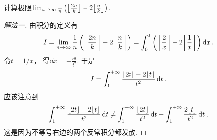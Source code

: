 \begin{example}
计算极限\(\lim_{n\to\infty} \frac1n \left( \floor*{\frac{2n}{k}} - 2 \floor*{\frac{n}{k} \vphantom{\frac{2n}{k}}} \right)\).
\begin{solution}\let\qed\relax
\begin{proof}[解法一]
由积分的定义有\[
	I = \lim_{n\to\infty} \frac1n \left( \floor*{\frac{2n}{k}} - 2 \floor*{\frac{n}{k} \vphantom{\frac{2n}{k}}} \right)
	= \int_0^1 \left( \floor*{\frac2x} - 2 \floor*{\frac1x} \right) \dd{x}.
\]
令\(t = 1/x\)，
得\(\dd{x} = -\frac{\dd{t}}{t^2}\).
于是\[
	I = \int_1^{+\infty} \frac{\lfloor2t\rfloor - 2\lfloor t\rfloor}{t^2} \dd{t}.
\]
应该注意到\[
	\int_1^{+\infty} \frac{\lfloor2t\rfloor - 2\lfloor t\rfloor}{t^2} \dd{t}
	\neq
	\int_1^{+\infty} \frac{\lfloor2t\rfloor}{t^2} \dd{t}
	- \int_1^{+\infty} \frac{2\lfloor t\rfloor}{t^2} \dd{t},
\]
这是因为不等号右边的两个反常积分都发散.


\end{proof}
\end{solution}
\end{example}
